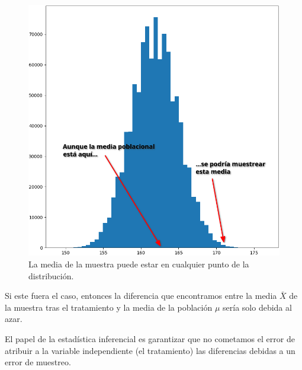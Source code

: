 \documentclass[a4paper,12pt]{article}
\begin{document}
\begin{figure}[!ht]
  \begin{center}
    \includegraphics[scale=0.5]{curvaNormal.png}
    \caption{La media de la muestra puede estar en cualquier punto de la distribución.}
  \end{center}
\end{figure}

Si este fuera el caso, entonces la diferencia que encontramos entre la media $\bar{X}$ de la muestra tras el tratamiento y la media de la población $\mu$ sería solo debida al azar.

El papel de la estadística inferencial es garantizar que no cometamos el error de atribuir a la variable independiente (el tratamiento) las diferencias debidas a un error de muestreo.
\end{document}
